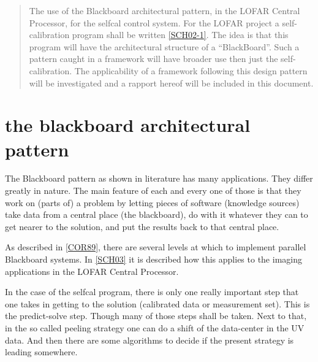 \documentclass[]{lofar}
\begin{document}
  \maketitle

  \begin{abstract}

    The use of the Blackboard architectural pattern, in the LOFAR
    Central Processor, for the selfcal control system.  For the LOFAR
    project a self-calibration program shall be written
    \hyperlink{LOFAR-ASTRON-ADD-006}{[SCH02-1]}. The idea
    is that this program will have the architectural structure of a
    ``BlackBoard''. Such a pattern caught in a framework will have
    broader use then just the self-calibration. The applicability of a
    framework following this design pattern will be investigated and a
    rapport hereof will be included in this document.

  \end{abstract}

  \tableofcontents

  \listoffigures

  \listoftables

  \section{the blackboard architectural pattern}
  \label{sec:blackboard-architectural-pattern}

    The Blackboard pattern as shown in literature has many
    applications. They differ greatly in nature. The main feature of
    each and every one of those is that they work on (parts of) a
    problem by letting pieces of software (knowledge sources) take
    data from a central place (the blackboard), do with it whatever
    they can to get nearer to the solution, and put the results back
    to that central place.

    As described in \hyperlink{bib:Design-Alternatives}{[COR89]}, there are
    several levels at which to implement parallel Blackboard
    systems. In \hyperlink{bib:PDR-CEP-Software}{[SCH03]} it is
    described how this applies to the imaging applications in the
    LOFAR Central Processor.

    In the case of the selfcal program, there is only one really
    important step that one takes in getting to the solution
    (calibrated data or measurement set). This is the predict-solve
    step. Though many of those steps shall be taken. Next to that, in
    the so called peeling strategy one can do a shift of the
    data-center in the UV data. And then there are some algorithms to
    decide if the present strategy is leading somewhere.
\end{document}
